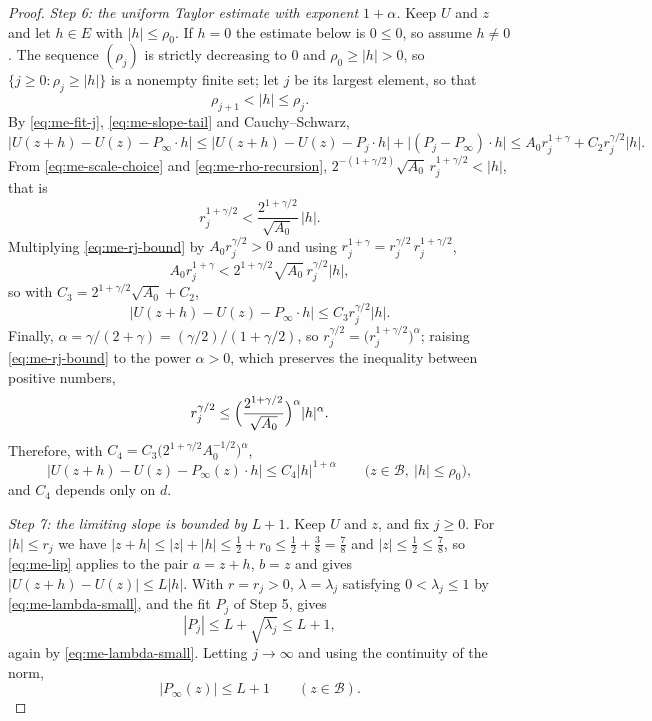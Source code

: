 \begin{proof}
\emph{Step 6: the uniform Taylor estimate with exponent $1+\alpha$.}
Keep $U$ and $z$ and let $h\in E$ with $|h|\le\rho_0$. If $h=0$ the estimate
below is $0\le0$, so assume $h\ne0$. The sequence $(\rho_j)$ is strictly
decreasing to $0$ and $\rho_0\ge|h|>0$, so $\{j\ge0:\rho_j\ge|h|\}$ is a
nonempty finite set; let $j$ be its largest element, so that
\begin{equation}\label{eq:me-scale-choice}
  \rho_{j+1}<|h|\le\rho_j .
\end{equation}
By \eqref{eq:me-fit-j}, \eqref{eq:me-slope-tail} and Cauchy--Schwarz,
\[
  \bigl|U(z+h)-U(z)-P_\infty\cdot h\bigr|
   \le\bigl|U(z+h)-U(z)-P_j\cdot h\bigr|+\bigl|(P_j-P_\infty)\cdot h\bigr|
   \le A_0r_j^{1+\gamma}+C_2r_j^{\gamma/2}|h| .
\]
From \eqref{eq:me-scale-choice} and \eqref{eq:me-rho-recursion},
$2^{-(1+\gamma/2)}\sqrt{A_0}\,r_j^{1+\gamma/2}<|h|$, that is
\begin{equation}\label{eq:me-rj-bound}
  r_j^{1+\gamma/2}<\frac{2^{1+\gamma/2}}{\sqrt{A_0}}\,|h| .
\end{equation}
Multiplying \eqref{eq:me-rj-bound} by $A_0r_j^{\gamma/2}>0$ and using
$r_j^{1+\gamma}=r_j^{\gamma/2}\,r_j^{1+\gamma/2}$,
\[
  A_0r_j^{1+\gamma}<2^{1+\gamma/2}\sqrt{A_0}\,r_j^{\gamma/2}|h| ,
\]
so with $C_3=2^{1+\gamma/2}\sqrt{A_0}+C_2$,
\[
  \bigl|U(z+h)-U(z)-P_\infty\cdot h\bigr|\le C_3r_j^{\gamma/2}|h| .
\]
Finally, $\alpha=\gamma/(2+\gamma)=(\gamma/2)/(1+\gamma/2)$, so
$r_j^{\gamma/2}=\bigl(r_j^{1+\gamma/2}\bigr)^{\alpha}$; raising
\eqref{eq:me-rj-bound} to the power $\alpha>0$, which preserves the inequality
between positive numbers,
\[
  r_j^{\gamma/2}\le\Bigl(\frac{2^{1+\gamma/2}}{\sqrt{A_0}}\Bigr)^{\alpha}|h|^\alpha .
\]
Therefore, with
$C_4=C_3\bigl(2^{1+\gamma/2}A_0^{-1/2}\bigr)^{\alpha}$,
\begin{equation}\label{eq:me-taylor}
  \bigl|U(z+h)-U(z)-P_\infty(z)\cdot h\bigr|\le C_4|h|^{1+\alpha}
  \qquad\bigl(z\in\mathcal B,\ |h|\le\rho_0\bigr),
\end{equation}
and $C_4$ depends only on $d$.

\emph{Step 7: the limiting slope is bounded by $L+1$.}
Keep $U$ and $z$, and fix $j\ge0$. For $|h|\le r_j$ we have
$|z+h|\le|z|+|h|\le\tfrac12+r_0\le\tfrac12+\tfrac38=\tfrac78$ and
$|z|\le\tfrac12\le\tfrac78$, so \eqref{eq:me-lip} applies to the pair
$a=z+h$, $b=z$ and gives $|U(z+h)-U(z)|\le L|h|$. With $r=r_j>0$,
$\lambda=\lambda_j$ satisfying $0<\lambda_j\le1$ by
\eqref{eq:me-lambda-small}, and the fit $P_j$ of Step 5,
 gives
\[
  |P_j|\le L+\sqrt{\lambda_j}\le L+1 ,
\]
again by \eqref{eq:me-lambda-small}. Letting $j\to\infty$ and using the
continuity of the norm,
\begin{equation}\label{eq:me-slope-bound}
  |P_\infty(z)|\le L+1\qquad(z\in\mathcal B).
\end{equation}


\end{proof}
